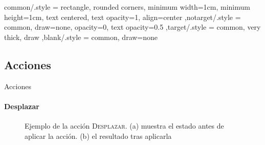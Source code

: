 \documentclass{beamer}
\begin{document}
\tikzset
  {common/.style =
    {rectangle, rounded corners, minimum width=1cm, minimum height=1cm,
     text centered, text opacity=1, align=center
    }
  ,notarget/.style = {common, draw=none, opacity=0, text opacity=0.5}
  ,target/.style   = {common, very thick, draw}
  ,blank/.style    = {common, draw=none}
  }

  \subsection{Acciones}
  \label{subsec:acciones}
  \begin{frame}[label=acciones]{Acciones}
    \framesubtitle{Desplazar}
    \begin{figure}[ht]
  \begin{subfigure}[b]{0.43\textwidth}
    \caption{}
  \end{subfigure}
  \qquad
  \begin{subfigure}[b]{0.3\textwidth}
    \caption{}
  \end{subfigure}
  \caption{Ejemplo de la acción \textsc{Desplazar}. (a) muestra el
    estado antes de aplicar la acción. (b) el resultado tras
    aplicarla}
  \label{fig:shiftaction}
\end{figure}
\end{frame}
\end{document}
